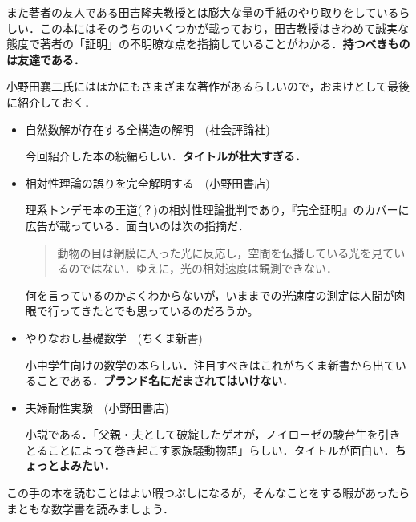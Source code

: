 また著者の友人である田吉隆夫教授とは膨大な量の手紙のやり取りをしているらしい．この本にはそのうちのいくつかが載っており，田吉教授はきわめて誠実な態度で著者の「証明」の不明瞭な点を指摘していることがわかる．\textbf{持つべきものは友達である．}



小野田襄二氏にはほかにもさまざまな著作があるらしいので，おまけとして最後に紹介しておく．

\begin{itemize}

\item 自然数解が存在する全構造の解明　(社会評論社)

今回紹介した本の続編らしい．\textbf{タイトルが壮大すぎる．}

\item 相対性理論の誤りを完全解明する　(小野田書店)

理系トンデモ本の王道(？)の相対性理論批判であり，『完全証明』のカバーに広告が載っている．面白いのは次の指摘だ．

\begin{quote}
動物の目は網膜に入った光に反応し，空間を伝播している光を見ているのではない．ゆえに，光の相対速度は観測できない．
\end{quote}

何を言っているのかよくわからないが，いままでの光速度の測定は人間が肉眼で行ってきたとでも思っているのだろうか。

\item やりなおし基礎数学　(ちくま新書)

小中学生向けの数学の本らしい．注目すべきはこれがちくま新書から出ていることである．\textbf{ブランド名にだまされてはいけない}．

\item 夫婦耐性実験　(小野田書店)

小説である．「父親・夫として破綻したゲオが，ノイローゼの駿台生を引きとることによって巻き起こす家族騒動物語」らしい．タイトルが面白い．\textbf{ちょっとよみたい．}
\end{itemize}



この手の本を読むことはよい暇つぶしになるが，そんなことをする暇があったらまともな数学書を読みましょう．
